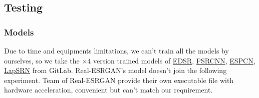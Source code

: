 \documentclass{article}
\begin{document}
  \subsection{Testing}
  \subsubsection*{Models}
  Due to time and equipments limitations, we can't train all the models by ourselves, so
  we take the $\times 4$ version trained models of 
  \href{https://github.com/Saafke/EDSR_Tensorflow/tree/master/models}{EDSR},
  \href{https://github.com/Saafke/FSRCNN_Tensorflow/tree/master/models}{FSRCNN},
  \href{https://github.com/fannymonori/TF-ESPCN/tree/master/export}{ESPCN},
  \href{https://github.com/fannymonori/TF-LapSRN/tree/master/export}{LapSRN} from GitLab.
  Real-ESRGAN's model doesn't join the following experiment. 
  Team of Real-ESRGAN provide their own executable file with hardware acceleration, convenient but can't match our requirement.
  
\end{document}
